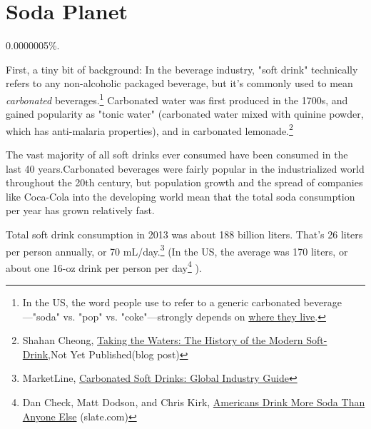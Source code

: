 {{
\chapter{Soda Planet}
}

\hfill{}

{0.0000005\%.}

{First, a tiny bit of background: In the beverage industry, "soft drink" technically refers to any non-alcoholic packaged beverage, but it's commonly used to mean \emph{carbonated} beverages.{\footnote{In the US, the word people use to refer to a generic carbonated beverage—"soda" vs. "pop" vs. "coke"—strongly depends on \href{http://www.popvssoda.com/}{where they live}.} } Carbonated water was first produced in the 1700s, and gained popularity as "tonic water" (carbonated water mixed with quinine powder, which has anti-malaria properties), and in carbonated lemonade.{\footnote{Shahan Cheong, \href{http://scheong.wordpress.com/2011/03/27/taking-the-waters-the-history-of-the-modern-soft-drink/} {Taking the Waters: The History of the Modern Soft-Drink},Not Yet Published(blog post)} } }

{The vast majority of all soft drinks ever consumed have been consumed in the last 40 years.Carbonated beverages were fairly popular in the industrialized world throughout the 20th century, but population growth and the spread of companies like Coca-Cola into the developing world mean that the total soda consumption per year has grown relatively fast.}

{Total soft drink consumption in 2013 was about 188 billion liters. That's 26 liters per person annually, or 70 mL/day.{\footnote{MarketLine, \href{http://www.reportlinker.com/p0171897-summary/Carbonated-Soft-Drinks-Global-Industry-Guide.html}{Carbonated Soft Drinks: Global Industry Guide}} } (In the US, the average was 170 liters, or about one 16-oz drink per person per day{\footnote{Dan Check, Matt Dodson, and Chris Kirk, \href{http://www.slate.com/articles/health\_and\_science/map\_of\_the\_week/2012/07/map\_of\_soda\_consumption\_americans\_drink\_more\_than\_anyone\_else\_.html}{Americans Drink More Soda Than Anyone Else} (slate.com)} }).}

}
